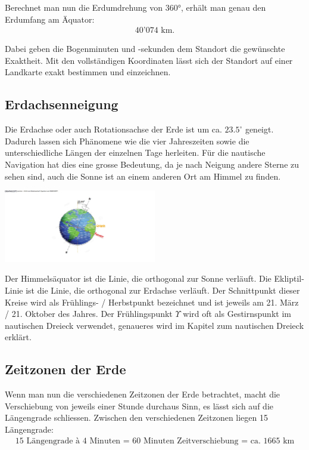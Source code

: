 \begin{refsection}
Berechnet man nun die Erdumdrehung von 360°, erhält man genau den Erdumfang am Äquator: \begin{align*} 40’074 \text{ km.}\end{align*}

Dabei geben die Bogenminuten und -sekunden dem Standort die gewünschte Exaktheit. Mit den vollständigen Koordinaten lässt sich der Standort auf einer Landkarte exakt bestimmen und einzeichnen.

\subsection{Erdachsenneigung}

Die Erdachse oder auch Rotationsachse der Erde ist um ca. $23.5^{\circ}$ geneigt.
Dadurch lassen sich Phänomene wie die vier Jahreszeiten sowie die unterschiedliche Längen der einzelnen Tage herleiten.
Für die nautische Navigation hat dies eine grosse Bedeutung, da je nach Neigung andere Sterne zu sehen sind, auch die Sonne ist an einem anderen Ort am Himmel zu finden.

\begin{center}
        \includegraphics[width=0.5\textwidth]{kugel/1Ekliptik.jpg}
\end{center}

Der Himmelsäquator ist die Linie, die orthogonal zur Sonne verläuft.
Die Ekliptil-Linie ist die Linie, die orthogonal zur Erdachse verläuft.
Der Schnittpunkt dieser Kreise wird als Frühlings- / Herbstpunkt bezeichnet und ist jeweils am 21. März / 21. Oktober des Jahres.
Der Frühlingspunkt $\Upsilon$ wird oft als Gestirnspunkt im nautischen Dreieck verwendet, genaueres wird im Kapitel zum nautischen Dreieck erklärt.


\subsection{Zeitzonen der Erde} \label{Zeitzonen} 
Wenn man nun die verschiedenen Zeitzonen der Erde betrachtet, macht die Verschiebung von jeweils einer Stunde durchaus Sinn, es lässt sich auf die Längengrade schliessen.
Zwischen den verschiedenen Zeitzonen liegen 15 Längengrade:
\begin{align*}
\text{15 Längengrade à 4 Minuten = 60 Minuten Zeitverschiebung = ca. 1665 km}
\end{align*}


\end{refsection}
